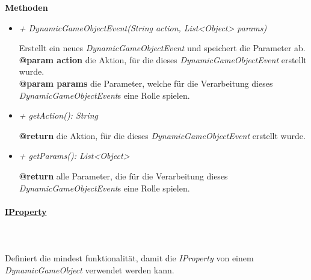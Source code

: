             \textbf{Methoden}
            \begin{itemize}
                \item \textit{+ DynamicGameObjectEvent(String action, List<Object> params)}
                    \begin{leftbar}[0.9\linewidth]
                        Erstellt ein neues \textit{DynamicGameObjectEvent} und speichert die Parameter ab.\\
                        \textbf{@param action} die Aktion, für die dieses \textit{DynamicGameObjectEvent} erstellt wurde.\\
                        \textbf{@param params} die Parameter, welche für die Verarbeitung dieses \textit{DynamicGameObjectEvent}s eine Rolle spielen.
                    \end{leftbar}
                \item \textit{+ getAction(): String}
                    \begin{leftbar}[0.9\linewidth]
                        \textbf{@return} die Aktion, für die dieses \textit{DynamicGameObjectEvent} erstellt wurde.
                    \end{leftbar}
                \item \textit{+ getParams(): List<Object>}
                    \begin{leftbar}[0.9\linewidth]
                        \textbf{@return} alle Parameter, die für die Verarbeitung dieses \textit{DynamicGameObjectEvent}s eine Rolle spielen.
                    \end{leftbar}
            \end{itemize}

        \pagebreak
        \paragraph{\underline{IProperty}} \mbox{}\\
        \\
            Definiert die mindest funktionalität, damit die \textit{IProperty} von einem \textit{DynamicGameObject} verwendet werden kann.\par

